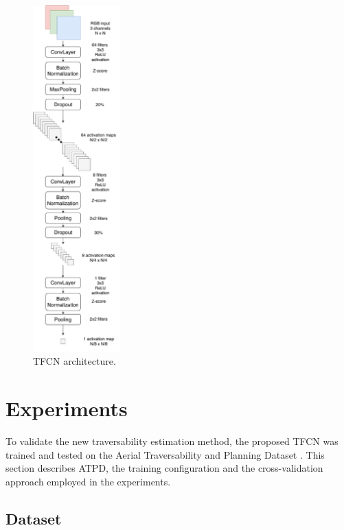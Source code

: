 \documentclass[conference]{IEEEtran}
\begin{document}
\begin{figure}[htbp]
\centerline{\includegraphics[width=0.3\textwidth]{graphics/TFCN.pdf}}
\caption{TFCN architecture.}
\label{fig}
\end{figure}

\section{Experiments}
\label{section:experiments}

To validate the new traversability estimation method, the proposed TFCN was trained and tested on the Aerial Traversability and Planning Dataset \cite{borges:2019}.
This section describes ATPD, the training configuration and the cross-validation approach employed in the experiments.

\subsection{Dataset}
\end{document}
